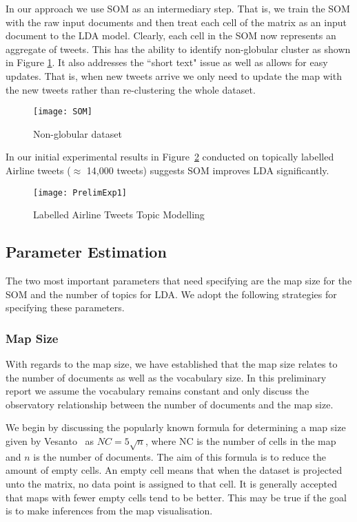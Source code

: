 \documentclass{article}
\begin{document}
In our approach we use  SOM as an intermediary step. That is, we train the SOM with the raw input documents and then treat each cell of the matrix as an input document to the LDA model. Clearly, each cell in the SOM now represents an aggregate of tweets. This has the ability to identify non-globular cluster as shown in Figure \ref{Ex-Fig1}. It also addresses the ``short text" issue as well as allows for easy updates. That is, when new tweets arrive we only need to update the map with the new tweets rather than re-clustering the whole dataset.

\begin{figure}[h]

\centering 
\texttt{[image: SOM]}
\caption{Non-globular dataset}\label{Ex-Fig1}

\end{figure}

In our initial experimental results in Figure~\ref{Ex-Fig2} conducted on topically labelled Airline tweets ($\approx$ 14,000 tweets) suggests SOM improves LDA significantly.

\begin{figure}[h]
	
	\centering 
	\texttt{[image: PrelimExp1]}
	\caption{Labelled Airline Tweets Topic Modelling}\label{Ex-Fig2}
	
\end{figure}

\subsection{Parameter Estimation}
The two most important parameters that need specifying are the map size for the SOM and the number of topics for LDA. We adopt the following strategies for specifying these parameters.

\subsubsection{Map Size}
With regards to the map size, we have established that the map size relates to the number of documents as well as the vocabulary size. In this preliminary report we assume the vocabulary remains constant and only discuss the observatory relationship between the number of documents and the map size. 

We begin by discussing the popularly known formula for determining a map size given by Vesanto~\cite{Vesanto00} as $NC=5\sqrt{n}$, where NC is the number of cells in the map and $n$ is the number of documents. The aim of this formula is to reduce the amount of empty cells. An empty cell means that when the dataset is projected unto the matrix, no data point is assigned to that cell. It is generally accepted that maps with fewer empty cells tend to be better. This may be true if the goal is to make inferences from the map visualisation. 
\end{document}
